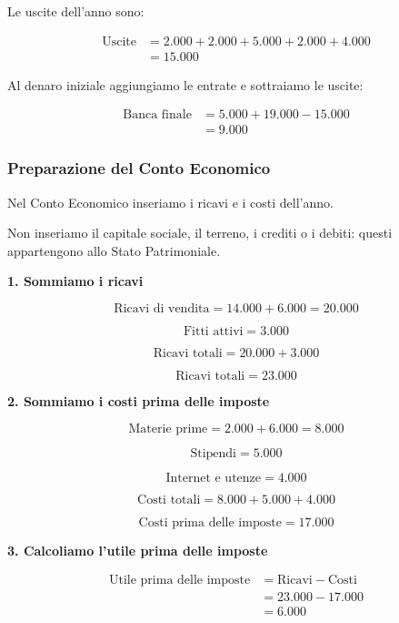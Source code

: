 \noindent Le uscite dell'anno sono:

\[
\begin{aligned}
\text{Uscite}
&=2.000+2.000+5.000+2.000+4.000\\
&=\boxed{15.000}
\end{aligned}
\]

\noindent Al denaro iniziale aggiungiamo le entrate
e sottraiamo le uscite:

\[
\begin{aligned}
\text{Banca finale}
&=5.000+19.000-15.000\\
&=\boxed{9.000}
\end{aligned}
\]

\subsubsection*{Preparazione del Conto Economico}

\noindent Nel Conto Economico inseriamo
i ricavi e i costi dell'anno.

\noindent Non inseriamo il capitale sociale,
il terreno, i crediti o i debiti:
questi appartengono allo Stato Patrimoniale.

\medskip

\noindent \textbf{1. Sommiamo i ricavi}

\[
\text{Ricavi di vendita}=14.000+6.000=20.000
\]

\[
\text{Fitti attivi}=3.000
\]

\[
\text{Ricavi totali}=20.000+3.000
\]

\[
\boxed{\text{Ricavi totali}=23.000}
\]

\medskip

\noindent \textbf{2. Sommiamo i costi prima delle imposte}

\[
\text{Materie prime}=2.000+6.000=8.000
\]

\[
\text{Stipendi}=5.000
\]

\[
\text{Internet e utenze}=4.000
\]

\[
\text{Costi totali}=8.000+5.000+4.000
\]

\[
\boxed{\text{Costi prima delle imposte}=17.000}
\]

\medskip

\noindent \textbf{3. Calcoliamo l'utile prima delle imposte}

\[
\begin{aligned}
\text{Utile prima delle imposte}
&=\text{Ricavi}-\text{Costi}\\
&=23.000-17.000\\
&=\boxed{6.000}
\end{aligned}
\]

